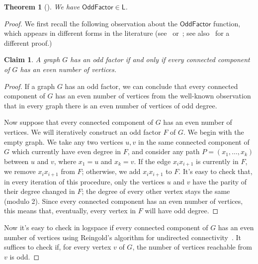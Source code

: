 \documentclass[10pt,a4paper]{article}
\newtheorem{theorem}{Theorem}[section]
\newtheorem*{claim*}{Claim}
\newcommand{\complexityfont}[1]{\mathsf{#1}}
\renewcommand{\L} {\complexityfont{L}}
\newcommand{\OddFactor}{\mathsf{OddFactor}}
\begin{document}
\begin{theorem}[\cite{joh03}]
    \label{thm:oddfactor-logspace}
    We have $\OddFactor \in \L$.
\end{theorem}
\begin{proof}
    We first recall the following observation about the $\OddFactor$
    function, which appears in different forms in the literature
    (see~\cite[Lemma 4.1]{DBLP:journals/jacm/Urquhart87}
    or~\cite[Lemma 18.16]{jukna_2012};
    see also~\cite[Proposition 1]{joh03} for a different proof.)
    \begin{claim*}
        A graph $G$ has an odd factor if and only if
        every connected component of $G$ has an even number of vertices.
    \end{claim*}
    \begin{proof}
        If a graph $G$ has an odd factor, 
        we can conclude
        that every
        connected
        component of $G$ has an even number of vertices
        from the well-known observation
        that in every graph 
        there is an even number of vertices of odd degree.

        Now suppose that every connected component of $G$ 
        has an even number of vertices.
        We will iteratively construct an odd factor $F$ of $G$.
        We begin with the empty graph.
        We take any two vertices $u,v$ in the same
        connected component of $G$
        which currently have even degree in $F$,
        and consider any path
        $P = (x_1,\dots,x_{k})$
        between $u$ and $v$,
        where $x_1 = u$ and $x_{k}=v$.
        If the edge $x_i x_{i+1}$ is currently in $F$, we remove 
        $x_i x_{i+1}$ from $F$; otherwise, we add $x_i x_{i+1}$ to
        $F$.
        It's easy to check that, in every iteration of this procedure,
        only the vertices $u$ and $v$ have the parity of their degree
        changed in $F$; the degree of every other vertex stays the same
        (modulo 2).
        Since every connected component has an even number of vertices,
        this means that, eventually, every vertex in $F$ will have odd
        degree.
    \end{proof}
    Now it's easy to check in logspace if every connected component of $G$ has an even
    number of vertices using Reingold's algorithm for undirected
    connectivity~\cite{DBLP:conf/stoc/Reingold05}.
    It suffices to check if, for every vertex $v$ of $G$,
    the number of vertices reachable from $v$ is odd.
\end{proof}
\end{document}
